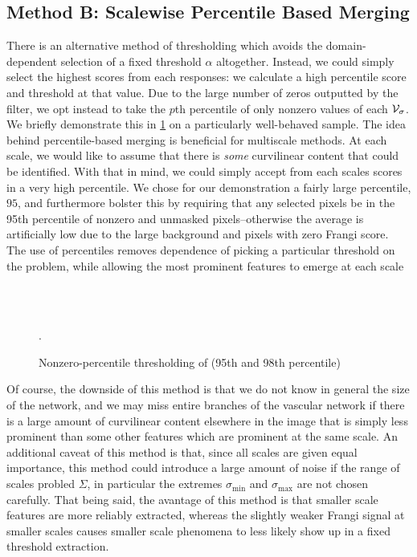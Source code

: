 \subsection{Method B: Scalewise Percentile Based Merging}

There is an alternative method of thresholding which avoids the domain-dependent selection of a fixed threshold $\alpha$ altogether. Instead, we could simply select the highest scores from each responses: we calculate a high percentile score and threshold at that value. Due to the large number of zeros outputted by the filter, we opt instead to take the $p$th percentile of only nonzero values of each $\mathcal{V}_{\sigma}$. 
We briefly demonstrate this in \cref{fig:qthresh_demo} on a particularly well-behaved sample. The idea behind percentile-based merging is beneficial for multiscale methods. At each scale, we would like to assume that there is \textit{some} curvilinear content that could be identified. With that in mind, we could simply accept from each scales scores in a very high percentile. We chose for our demonstration a fairly large percentile, $95$, and furthermore bolster this by requiring that any selected pixels be in the 95th percentile of nonzero and unmasked pixels--otherwise the average is artificially low due to the large background and pixels with zero Frangi score. The use of percentiles removes dependence of picking a particular threshold on the problem, while allowing the most prominent features to emerge at each scale

\begin{figure} \centering
	 \\
	 \\
	\caption{Nonzero-percentile thresholding of \Vmax (95th and 98th percentile)}.
	\label{fig:qthresh_demo}
\end{figure}

Of course, the downside of this method is that we do not know in general the size of the network, and  we may miss entire branches of the vascular network if there is a large amount of curvilinear content elsewhere in the image that is simply less prominent than some other features which are prominent at the same scale. An additional caveat of this method is that, since all scales are given equal importance, this method could introduce a large amount of noise if the range of scales probled $\Sigma$, in particular the extremes $\sigma_{\min}$ and $\sigma_{\max}$ are not chosen carefully. That being said, the avantage of this method is that smaller scale features are more reliably extracted, whereas the slightly weaker Frangi signal at smaller scales causes smaller scale phenomena to less likely show up in a fixed threshold extraction.


